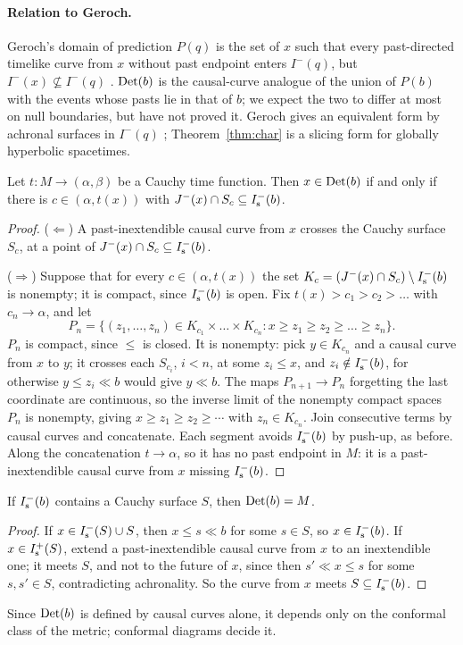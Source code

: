\paragraph{Relation to Geroch.} Geroch's domain of prediction $P(q)$ is the set
of $x$ such that every past-directed timelike curve from $x$ without past
endpoint enters $I^-(q)$, but $I^-(x)\not\subseteq I^-(q)$ \citep[sec.~3]{Geroch1977}.
$\mathrm{Det}(b)$ is the causal-curve analogue of the union of $P(b)$ with the
events whose pasts lie in that of $b$; we expect the two to differ at most
on null boundaries, but have not proved it. Geroch gives an equivalent form by achronal surfaces in $I^-(q)$
\citep[sec.~3]{Geroch1977}; Theorem~\ref{thm:char} is a slicing form for
globally hyperbolic spacetimes.

\begin{theorem}\label{thm:char}
Let $t:M\to(\alpha,\beta)$ be a Cauchy time function. Then $x\in\mathrm{Det}(b)$ if
and only if there is $c\in(\alpha,t(x))$ with $J^-(x)\cap S_c\subseteq I^-_{\mathrm s}(b)$.
\end{theorem}

\begin{proof}
($\Leftarrow$) A past-inextendible causal curve from $x$ crosses the Cauchy
surface $S_c$, at a point of $J^-(x)\cap S_c\subseteq I^-_{\mathrm s}(b)$.

($\Rightarrow$) Suppose that for every $c\in(\alpha,t(x))$ the set
$K_c=(J^-(x)\cap S_c)\setminus I^-_{\mathrm s}(b)$ is nonempty; it is compact, since
$I^-_{\mathrm s}(b)$ is open. Fix $t(x)>c_1>c_2>\dots$ with $c_n\to\alpha$, and let
\[P_n=\{(z_1,\dots,z_n)\in K_{c_1}\times\dots\times K_{c_n}:
x\ge z_1\ge z_2\ge\dots\ge z_n\}.\]
$P_n$ is compact, since $\le$ is closed. It is nonempty: pick $y\in K_{c_n}$
and a causal curve from $x$ to $y$; it crosses each $S_{c_i}$, $i<n$, at some
$z_i\le x$, and $z_i\notin I^-_{\mathrm s}(b)$, for otherwise $y\le z_i\ll b$ would give
$y\ll b$. The maps $P_{n+1}\to P_n$ forgetting the last coordinate are
continuous, so the inverse limit of the nonempty compact spaces $P_n$ is
nonempty, giving $x\ge z_1\ge z_2\ge\cdots$ with $z_n\in K_{c_n}$. Join
consecutive terms by causal curves and concatenate. Each segment avoids
$I^-_{\mathrm s}(b)$ by push-up, as before. Along the concatenation $t\to\alpha$, so it has
no past endpoint in $M$: it is a past-inextendible causal curve from $x$
missing $I^-_{\mathrm s}(b)$.
\end{proof}

\begin{corollary}\label{cor:cauchy}
If $I^-_{\mathrm s}(b)$ contains a Cauchy surface $S$, then $\mathrm{Det}(b)=M$.
\end{corollary}

\begin{proof}
If $x\in I^-_{\mathrm s}(S)\cup S$, then $x\le s\ll b$ for some $s\in S$, so $x\in I^-_{\mathrm s}(b)$.
If $x\in I^+_{\mathrm s}(S)$, extend a past-inextendible causal curve from $x$ to an
inextendible one; it meets $S$, and not to the future of $x$, since then
$s'\ll x\le s$ for some $s,s'\in S$, contradicting achronality. So the curve
from $x$ meets $S\subseteq I^-_{\mathrm s}(b)$.
\end{proof}

Since $\mathrm{Det}(b)$ is defined by causal curves alone, it depends only on the
conformal class of the metric; conformal diagrams decide it.
